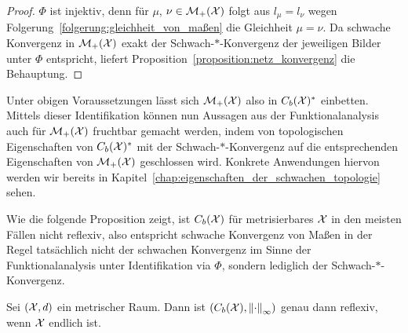 \documentclass[../thesis/thesis.tex]{subfiles}
\begin{document}
	\begin{proof}
		$\Phi$ ist injektiv, denn für $\mu$, $\nu \in \mathcal{M}_{+}(\mathcal{X})$ folgt aus $l_\mu = l_\nu$ wegen Folgerung~\ref{folgerung:gleichheit_von_maßen} die Gleichheit $\mu = \nu$. 
		Da schwache Konvergenz in $\mathcal{M}_{+}(\mathcal{X})$ exakt der Schwach-$\ast$-Konvergenz der jeweiligen Bilder unter $\Phi$ entspricht, liefert Proposition~\ref{proposition:netz_konvergenz}
		die Behauptung.
	\end{proof}

	Unter obigen Voraussetzungen lässt sich $\mathcal{M}_{+}(\mathcal{X})$ also in $C_b(\mathcal{X})^\ast$ einbetten. Mittels dieser Identifikation können nun Aussagen aus der 
	Funktionalanalysis auch für $\mathcal{M}_{+}(\mathcal{X})$ fruchtbar gemacht werden, indem von topologischen Eigenschaften von
	$C_b(\mathcal{X})^\ast$ mit der Schwach-$\ast$-Konvergenz auf die entsprechenden Eigenschaften von 
	$\mathcal{M}_{+}(\mathcal{X})$ geschlossen wird. Konkrete Anwendungen hiervon werden wir bereits in Kapitel~\ref{chap:eigenschaften_der_schwachen_topologie} sehen.
	
	Wie die folgende Proposition zeigt, ist $C_b(\mathcal{X})$ für metrisierbares $\mathcal{X}$ in den meisten Fällen nicht reflexiv, also entspricht schwache Konvergenz von Maßen
	in der Regel tatsächlich nicht der schwachen Konvergenz im Sinne der Funktionalanalysis unter Identifikation via $\Phi$, sondern lediglich der Schwach-$\ast$-Konvergenz.
	
	\begin{Proposition}
		Sei $(\mathcal{X}, d)$ ein metrischer Raum. Dann ist $(C_b(\mathcal{X}), \left\lVert\cdot\right\rVert_{\infty})$ genau dann reflexiv, wenn $\mathcal{X}$ endlich ist.
	\end{Proposition}
\end{document}
